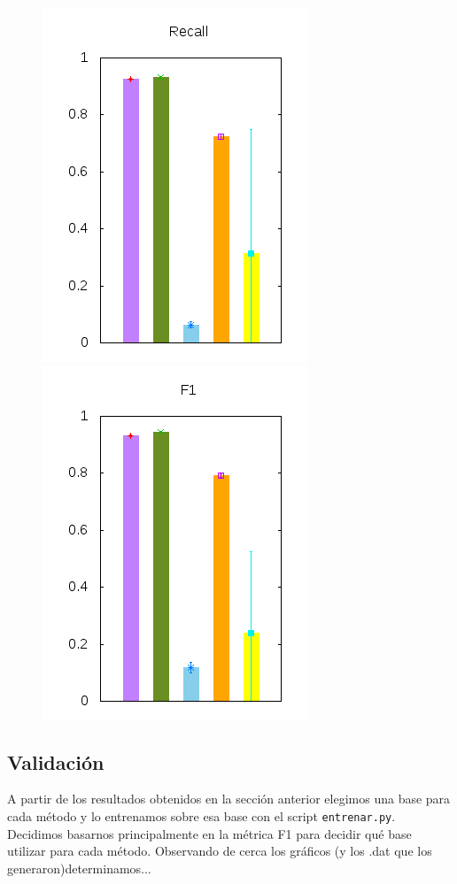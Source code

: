 \documentclass[10pt, a4paper]{article}
\begin{document}
\begin{figure}[H]
\begin{minipage}{1\textwidth}
	\includegraphics[scale=0.5]{../src/data/re.png}
	\includegraphics[scale=0.5]{../src/data/f1.png}
  \end{minipage}
\end{figure}

\subsection{Validación}

A partir de los resultados obtenidos en la sección anterior elegimos una base para cada método y lo entrenamos sobre esa base con el script \texttt{entrenar.py}. Decidimos basarnos principalmente en la métrica F1 para decidir qué base utilizar para cada método. Observando de cerca los gráficos (y los .dat que los generaron)determinamos...
\end{document}
